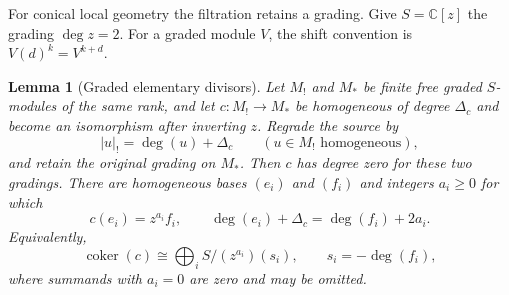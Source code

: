 \documentclass[10pt,a4paper]{amsart}
\newtheorem{lemma}[theorem]{Lemma}
\begin{document}
For conical local geometry the filtration retains a grading.  Give
$S=\mathbb C[z]$ the grading $\deg z=2$.  For a graded module $V$, the shift
convention is $V(d)^k=V^{k+d}$.

\begin{lemma}[Graded elementary divisors]\label{lem:graded-smith}
Let $M_!$ and $M_*$ be finite free graded $S$-modules of the same rank, and
let $c:M_!\to M_*$ be homogeneous of degree $\Delta_c$ and become an
isomorphism after inverting $z$.  Regrade the source by
\[
 |u|_!=\deg(u)+\Delta_c
 \qquad(u\in M_!\text{ homogeneous}),
\]
and retain the original grading on $M_*$.  Then $c$ has degree zero for these
two gradings.  There are homogeneous bases $(e_i)$ and $(f_i)$ and integers
$a_i\geq0$ for which
\[
 c(e_i)=z^{a_i}f_i,
 \qquad
 \deg(e_i)+\Delta_c=\deg(f_i)+2a_i.
\]
Equivalently,
\[
 \operatorname{coker}(c)\cong
 \bigoplus_i S/(z^{a_i})(s_i),
 \qquad s_i=-\deg(f_i),
\]
where summands with $a_i=0$ are zero and may be omitted.
\end{lemma}
\end{document}
